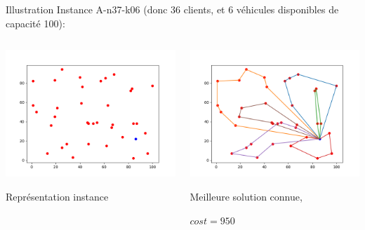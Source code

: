 \documentclass{beamer}
\begin{document}
\begin{frame}{Illustration}
Instance A-n37-k06 (donc 36 clients, et 6 véhicules disponibles de capacité 100):
 \begin{columns}[t]
  \begin{column}{5cm}
  	\centering
	\includegraphics[scale=0.32]{instanceA3706.png}
	
	Représentation instance 
  \end{column}
  
  \begin{column}{5cm}
  	\centering
	\includegraphics[scale=0.32]{bestA3706.png}
 
 	Meilleure solution connue,
 	
 	$cost = 950$
  \end{column}
 \end{columns}

\end{frame}
\end{document}
